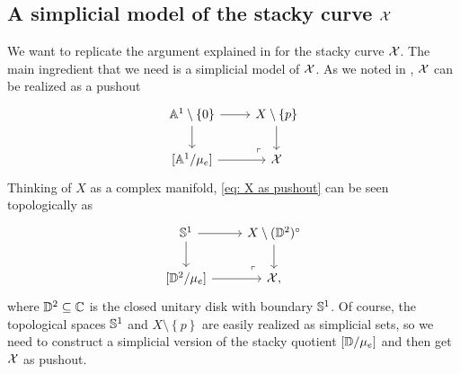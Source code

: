 \subsection{A simplicial model of the stacky curve $\mathcal{X}$}
We want to replicate the argument explained in  for the stacky curve $\mathcal{X}$. The main ingredient that we need is a simplicial model of $\mathcal{X}$. As we noted in , $\mathcal{X}$ can be realized as a pushout
\begin{equation} \label{eq: X as pushout}
\begin{tikzcd}
	{\Ab^1 \setminus \{0\}} & {X \setminus \{ p\}} \\
	{[\Ab^1/\mu_e]} & {\mc{X}}
	\arrow[from=1-1, to=1-2]
	\arrow[from=1-1, to=2-1]
	\arrow[from=1-2, to=2-2]
	\arrow[from=2-1, to=2-2]
	\arrow["\lrcorner"{anchor=center, pos=0.125, rotate=180}, draw=none, from=2-2, to=1-1]
\end{tikzcd}
\end{equation}
Thinking of $X$ as a complex manifold, \eqref{eq: X as pushout} can be seen topologically as
\begin{equation} \label{eq: X as pushout topologically}
\begin{tikzcd}
	{\Sb^1} & {X \setminus (\Db^2)^{\circ}} \\
	{[\Db^2/\mu_e]} & {\mc{X},}
	\arrow[from=1-1, to=1-2]
	\arrow[from=1-1, to=2-1]
	\arrow[from=1-2, to=2-2]
	\arrow[from=2-1, to=2-2]
	\arrow["\lrcorner"{anchor=center, pos=0.125, rotate=180}, draw=none, from=2-2, to=1-1]
\end{tikzcd}
\end{equation}
where $\mathbb{D}^2 \subseteq \mathbb{C}$ is the closed unitary disk with boundary $\mathbb{S}^1$. Of course, the topological spaces $\mathbb{S}^1$ and $X \setminus \left\{ p \right\}$ are easily realized as simplicial sets, so we need to construct a simplicial version of the stacky quotient $[\mathbb{D} / \mu_e]$ and then get $\mathcal{X}$ as pushout.

